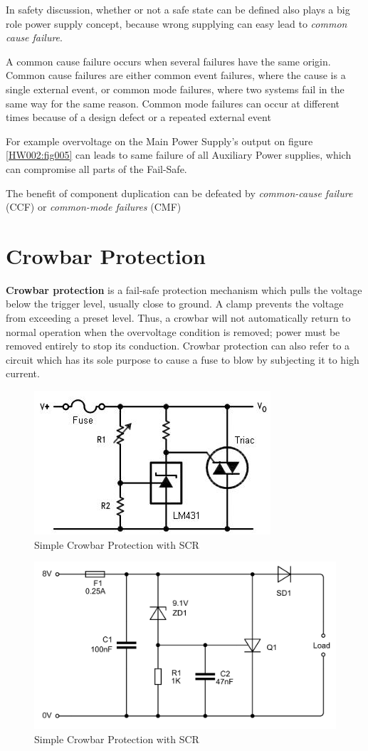 \documentclass[journal]{IEEEtran}
\begin{document}
  In safety discussion, whether or not a safe state can be defined also plays a big role power 
  supply concept, because wrong supplying can easy lead to \emph{common cause failure}.
  
  A common cause failure occurs when several failures have the same origin. Common cause failures 
  are either common event failures, where the cause is a single external event, or common mode 
  failures, where two systems fail in the same way for the same reason. Common mode failures can 
  occur at different times because of a design defect or a repeated external event
  
  For example overvoltage on the Main Power Supply's output on figure \ref{HW002:fig005} can leads 
  to same failure of all Auxiliary Power supplies, which can compromise all parts of the Fail-Safe. 
  
  The benefit of component duplication can be defeated by \emph{common-cause failure} (CCF) or 
  \emph{common-mode failures} (CMF)
  
\section{Crowbar Protection}
  \textbf{Crowbar protection} is a fail-safe protection mechanism which pulls the voltage below the 
  trigger level, usually close to ground. A clamp prevents the voltage from exceeding a preset 
  level. Thus, a crowbar will not automatically return to normal operation when the overvoltage 
  condition is removed; power must be removed entirely to stop its conduction. Crowbar protection 
  can also refer to a circuit which has its sole purpose to cause a fuse to blow by subjecting it 
  to high current.

  \begin{figure}[!ht] %
    \centering
    \includegraphics[width=0.6\linewidth]{fig_HW003.jpg}
    \caption{Simple Crowbar Protection with SCR}
    \label{HW002:fig003}
  \end{figure}

  \begin{figure}[!ht] %
    \centering
    \includegraphics[width=0.6\linewidth]{fig_HW004.png}
    \caption{Simple Crowbar Protection with SCR}
    \label{HW002:fig004}
  \end{figure}
  
\nocite{*}
\printbibliography
\end{document}
